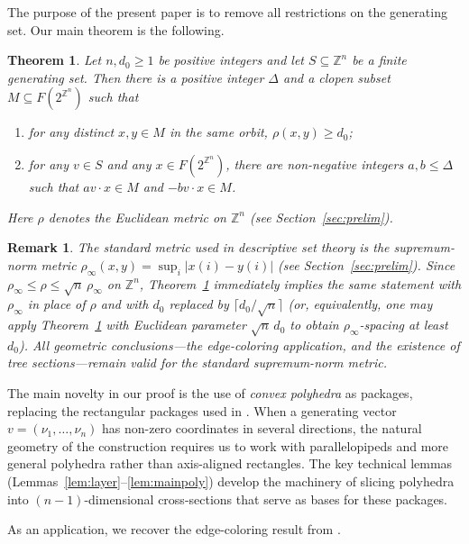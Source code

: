\documentclass[10pt,a4paper]{amsart}
\newtheorem{theorem}{Theorem}[section]
\newtheorem*{remark}{Remark}
\begin{document}
The purpose of the present paper is to remove all restrictions on the
generating set. Our main theorem is the following.


\begin{theorem}\label{thm:main}
Let $n, d_0\geq 1$ be positive integers and let $S\subseteq \mathbb{Z}^n$ be a finite generating set. Then there is a positive integer $\Delta$ and a clopen subset $M\subseteq F(2^{\mathbb{Z}^n})$ such that
\begin{enumerate}
\item[(1)] for any distinct $x,y\in M$ in the same orbit, $\rho(x,y)\geq d_0$;
\item[(2)] for any $v\in S$ and any $x\in F(2^{\mathbb{Z}^n})$, there are non-negative integers $a, b\leq \Delta$ such that $av\cdot x\in M$ and $-bv\cdot x\in M$.
\end{enumerate}
Here $\rho$ denotes the Euclidean metric on $\mathbb{Z}^n$ (see Section~\ref{sec:prelim}).
\end{theorem}


\begin{remark}\label{rem:infinity}
The standard metric used in descriptive set theory is the supremum-norm
metric $\rho_\infty(x,y)=\sup_i|x(i)-y(i)|$ (see Section~\ref{sec:prelim}).
Since $\rho_\infty\leq \rho\leq\sqrt{n}\,\rho_\infty$ on $\mathbb{Z}^n$,
Theorem~\ref{thm:main} immediately implies the same statement with
$\rho_\infty$ in place of $\rho$ and with $d_0$ replaced by
$\lceil d_0/\sqrt{n}\rceil$ (or, equivalently, one may apply
Theorem~\ref{thm:main} with Euclidean parameter $\sqrt{n}\,d_0$ to obtain
$\rho_\infty$-spacing at least $d_0$). All geometric conclusions---the
edge-coloring application, and the existence of tree sections---remain
valid for the standard supremum-norm metric.
\end{remark}

The main novelty in our proof is the use of {\em convex polyhedra} as
packages, replacing the rectangular packages used in \cite{GW25}. When a
generating vector $v=(\nu_1,\dots,\nu_n)$ has non-zero coordinates in several
directions, the natural geometry of the construction requires us to work with
parallelopipeds and more general polyhedra rather than axis-aligned rectangles.
The key technical lemmas (Lemmas~\ref{lem:layer}--\ref{lem:mainpoly}) develop
the machinery of slicing polyhedra into $(n-1)$-dimensional cross-sections
that serve as bases for these packages.

As an application, we recover the edge-coloring result
from \cite{GWW25}.
\end{document}
